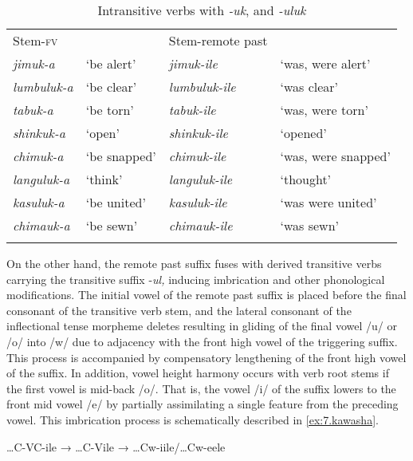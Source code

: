 \documentclass[output=paper]{langsci/langscibook}
\begin{document}
\begin{table}
\begin{tabular}{llll}
\lsptoprule
Stem-\textsc{fv} &  & Stem-remote past & \\
\textit{jimuk-a} & `be alert' & \textit{jimuk-ile} & `was, were alert' \\
\textit{lumbuluk-a} & `be clear' & \textit{lumbuluk-ile} & `was clear' \\
\textit{tabuk-a} & `be torn' & \textit{tabuk-ile} & `was, were torn' \\
\textit{shinkuk-a} & `open' & \textit{shinkuk-ile} & `opened' \\
\textit{chimuk-a} & `be snapped' & \textit{chimuk-ile} & `was, were snapped' \\
\textit{languluk-a} & `think' & \textit{languluk-ile} & `thought' \\
\textit{kasuluk-a} & `be united' & \textit{kasuluk-ile} & `was were united' \\
\textit{chimauk-a} & `be sewn' & \textit{chimauk-ile} & `was sewn' \\

\lspbottomrule
\end{tabular}

\caption{Intransitive verbs with \textit{-uk}, and \textit{-uluk}}
\label{tab:22.kawasha}

\end{table}



On the other hand, the remote past suffix fuses with derived transitive verbs carrying the transitive suffix -\textit{ul,} inducing imbrication and other phonological modifications. The initial vowel of the remote past suffix is placed before the final consonant of the transitive verb stem, and the lateral consonant of the inflectional tense morpheme deletes resulting in gliding of the final vowel /u/ or /o/ into /w/ due to adjacency with the front high vowel of the triggering suffix. This process is accompanied by compensatory lengthening of the front high vowel of the suffix. In addition, vowel height harmony occurs with verb root stems if the first vowel is mid-back /o/. That is, the vowel /i/ of the suffix lowers to the front mid vowel /e/ by partially assimilating a single feature from the preceding vowel. This imbrication process is schematically described in \ref{ex:7.kawasha}.

\ea
\label{ex:7.kawasha}

…C-VC-ile  →  …C-Vile  →  …Cw-iile/…Cw-eele
\end{document}
